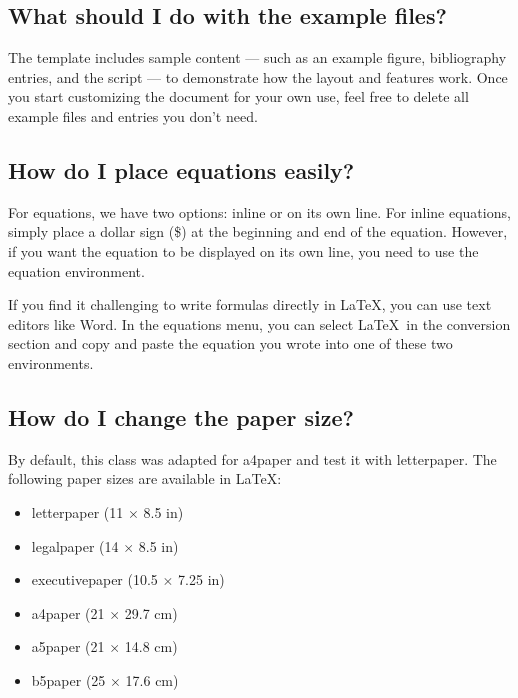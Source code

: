\documentclass[9pt,a4paper,twocolumn,twoside]{rho-class/rho}
\begin{document}
    \subsection*{What should I do with the example files?}

        The template includes sample content — such as an example figure, bibliography entries, and the  script — to demonstrate how the layout and features work. Once you start customizing the document for your own use, feel free to delete all example files and entries you don’t need.

    \subsection*{How do I place equations easily?}

        For equations, we have two options: inline or on its own line. For inline equations, simply place a dollar sign (\$) at the beginning and end of the equation. However, if you want the equation to be displayed on its own line, you need to use the equation environment.
        
        If you find it challenging to write formulas directly in \LaTeX, you can use text editors like Word. In the equations menu, you can select \LaTeX\ in the conversion section and copy and paste the equation you wrote into one of these two environments.

    \subsection*{How do I change the paper size?}

        By default, this class was adapted for a4paper and test it with letterpaper. The following paper sizes are available in \LaTeX:

        \begin{itemize}
            \item letterpaper (11 $\times$ 8.5 in)
            \item legalpaper (14 $\times$ 8.5 in)
            \item executivepaper (10.5 $\times$ 7.25 in)
            \item a4paper (21 $\times$ 29.7 cm)
            \item a5paper (21 $\times$ 14.8 cm)
            \item b5paper (25 $\times$ 17.6 cm)
       \end{itemize}
\end{document}
